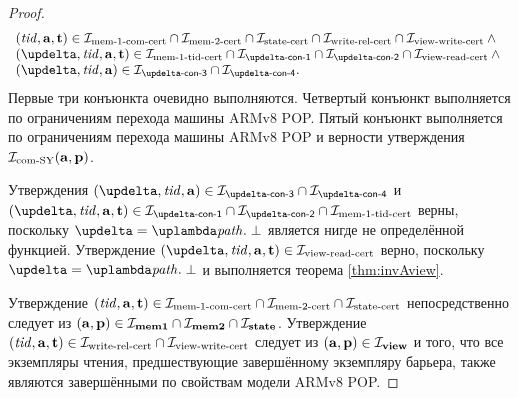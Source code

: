 \begin{proof}
\[\begin{array}{l}
 (\tId, \aT, \tT) \in \invMemOneCERT \cap \invMemTwoCERT \cap \invStateCERT \cap \invViewRelCERT \cap \invViewWriteCERT \land {} \\
 (\delta, \tId, \aT, \tT) \in \invMemZeroCERT \cap \invDeltaDefOne \cap \invDeltaDefTwo \cap
               \invViewReadCERT \land {} \\
 (\delta, \tId, \aT) \in \invDeltaDefThree \cap \invDeltaDefFour. \\
  \end{array}\]
  Первые три конъюнкта очевидно выполняются.
  Четвертый конъюнкт выполняется по ограничениям перехода  машины ARMv8 POP.
  Пятый конъюнкт выполняется по ограничениям перехода  машины ARMv8 POP и
  верности утверждения $\mathcal{I}_{\textup{\rm com-SY}}(\mathbf{a}, \mathbf{p})$.

  Утверждения $(\delta, \tId, \aT) \in \invDeltaDefThree \cap \invDeltaDefFour$ и
  $(\delta, \tId, \aT, \tT) \in \invDeltaDefOne \cap \invDeltaDefTwo \cap \invMemZeroCERT$
  верны, поскольку $\delta = \lambda \cpath. \; \bot$ является нигде не определённой функцией.
  Утверждение $(\delta, \tId, \aT, \tT) \in \invViewReadCERT$ верно, поскольку
  $\delta = \lambda \cpath. \; \bot$ и выполняется теорема \ref{thm:invAview}.

  Утверждение $(\mathit{tid}, \mathbf{a}, \mathbf{t}) \in \mathcal{I}_{\textup{\rm mem-1-com-cert}} \cap \mathcal{I}_{\textup{\rm mem-2-cert}} \cap \mathcal{I}_{\textup{\rm state-cert}}$
  непосредственно следует из $(\mathbf{a}, \mathbf{p}) \in \mathcal{I}_{\rm \bf mem1} \cap \mathcal{I}_{\rm \bf mem2} \cap \mathcal{I}_{\rm \bf state}$.
  Утверждение $(\mathit{tid}, \mathbf{a}, \mathbf{t}) \in \mathcal{I}_{\textup{\rm write-rel-cert}} \cap \mathcal{I}_{\textup{\rm view-write-cert}}$ следует из $(\mathbf{a}, \mathbf{p}) \in \mathcal{I}_{\rm \bf view}$
  и того, что все экземпляры чтения, предшествующие завершённому экземпляру барьера, также являются завершёнными
  по свойствам модели ARMv8 POP.
\end{proof}




